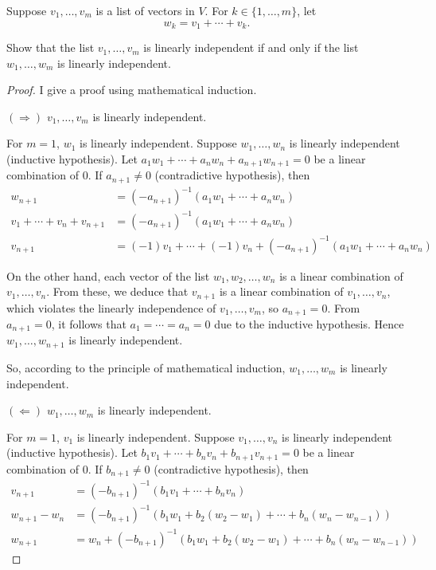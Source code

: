 \begin{exercise}\label{chapter2:sectionA:exercise14}
    Suppose $v_{1}, \ldots, v_{m}$ is a list of vectors in $V$. For $k\in \{ 1,\ldots, m \}$, let
    \[
        w_{k} = v_{1} + \cdots + v_{k}.
    \]

    Show that the list $v_{1}, \ldots, v_{m}$ is linearly independent if and only if the list $w_{1}, \ldots, w_{m}$ is linearly independent.
\end{exercise}

\begin{proof}
    I give a proof using mathematical induction.

    $(\Rightarrow)$ $v_{1}, \ldots, v_{m}$ is linearly independent.

    For $m = 1$, $w_{1}$ is linearly independent. Suppose $w_{1}, \ldots, w_{n}$ is linearly independent (inductive hypothesis). Let $a_{1}w_{1} + \cdots + a_{n}w_{n} + a_{n+1}w_{n+1} = 0$ be a linear combination of $0$. If $a_{n+1}\ne 0$ (contradictive hypothesis), then
    \begin{align*}
        w_{n+1}                          & = {(-a_{n+1})}^{-1}(a_{1}w_{1} + \cdots + a_{n}w_{n})                                  \\
        v_{1} + \cdots + v_{n} + v_{n+1} & = {(-a_{n+1})}^{-1}(a_{1}w_{1} + \cdots + a_{n}w_{n})                                  \\
        v_{n+1}                          & = (-1)v_{1} + \cdots + (-1)v_{n} + {(-a_{n+1})}^{-1}(a_{1}w_{1} + \cdots + a_{n}w_{n})
    \end{align*}

    On the other hand, each vector of the list $w_{1}, w_{2}, \ldots, w_{n}$ is a linear combination of $v_{1}, \ldots, v_{n}$. From these, we deduce that $v_{n+1}$ is a linear combination of $v_{1}, \ldots, v_{n}$, which violates the linearly independence of $v_{1}, \ldots, v_{m}$, so $a_{n+1} = 0$. From $a_{n+1} = 0$, it follows that $a_{1} = \cdots = a_{n} = 0$ due to the inductive hypothesis. Hence $w_{1}, \ldots, w_{n+1}$ is linearly independent.

    So, according to the principle of mathematical induction, $w_{1}, \ldots, w_{m}$ is linearly independent.

    $(\Leftarrow)$ $w_{1}, \ldots, w_{m}$ is linearly independent.

    For $m = 1$, $v_{1}$ is linearly independent. Suppose $v_{1}, \ldots, v_{n}$ is linearly independent (inductive hypothesis). Let $b_{1}v_{1} + \cdots + b_{n}v_{n} + b_{n+1}v_{n+1} = 0$ be a linear combination of $0$. If $b_{n+1}\ne 0$ (contradictive hypothesis), then
    \begin{align*}
        v_{n+1}         & = {(-b_{n+1})}^{-1}(b_{1}v_{1} + \cdots + b_{n}v_{n})                                            \\
        w_{n+1} - w_{n} & = {(-b_{n+1})}^{-1}(b_{1}w_{1} + b_{2}(w_{2} - w_{1}) + \cdots + b_{n}(w_{n} - w_{n-1}))         \\
        w_{n+1}         & = w_{n} + {(-b_{n+1})}^{-1}(b_{1}w_{1} + b_{2}(w_{2} - w_{1}) + \cdots + b_{n}(w_{n} - w_{n-1}))
    \end{align*}


\end{proof}
